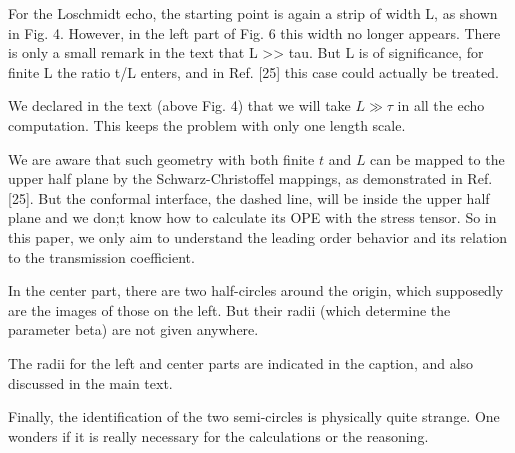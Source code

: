 \documentclass{article}
\newcommand{\reply}[1]{{\color{black}#1}}
\begin{document}
For the Loschmidt echo, the starting point is again a strip of width L, as shown in Fig. 4. However, in the left part of Fig. 6 this width no longer appears. There is only a small remark in the text that L >> tau. But L is of significance, for finite L the ratio t/L enters, and in Ref. [25] this case could actually be treated. 

\reply{We declared in the text (above Fig. 4) that we will take $L \gg \tau$ in all the echo computation. This keeps the problem with only one length scale. 

  We are aware that such geometry with both finite $t$ and $L$ can be mapped to the upper half plane by the Schwarz-Christoffel mappings, as demonstrated in Ref.[25]. But the conformal interface, the dashed line, will be inside the upper half plane and we don;t know how to calculate its OPE with the stress tensor. So in this paper, we only aim to understand the leading order behavior and its relation to the transmission coefficient. }


In the center part, there are two half-circles around the origin, which supposedly are the images of those on the left. But their radii (which determine the parameter beta) are not given anywhere. 

\reply{The radii for the left and center parts are indicated in the caption, and also discussed in the main text.}

Finally, the identification of the two semi-circles is physically quite strange. One wonders if it is really necessary for the calculations or the reasoning.
\end{document}
